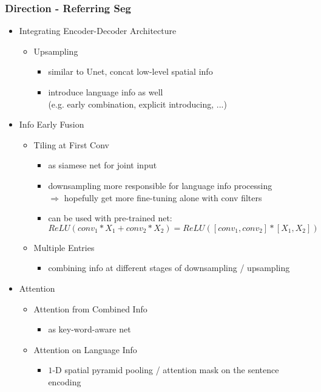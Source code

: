 \subsubsection{Direction - Referring Seg}
\begin{itemize}
\item Integrating Encoder-Decoder Architecture
	\begin{itemize}
	\item Upsampling
		\begin{itemize}
		\item similar to Unet, concat low-level spatial info
		\item introduce language info as well \\
		(e.g. early combination, explicit introducing, ...)
		\end{itemize}
	\end{itemize}
\item Info Early Fusion
	\begin{itemize}
	\item Tiling at First Conv
		\begin{itemize}
		\item as siamese net for joint input
		\item downsampling more responsible for language info processing \\
		$\Rightarrow$ hopefully get more fine-tuning alone with conv filters
		\item can be used with pre-trained net: \\ 
		$ReLU(conv_1*X_1 + conv_2*X_2) = ReLU( [conv_1,conv_2]*[X_1,X_2] )$
		\end{itemize}
	\item Multiple Entries
		\begin{itemize}
		\item combining info at different stages of downsampling / upsampling
		\end{itemize}
	\end{itemize}
\item Attention
	\begin{itemize}
	\item Attention from Combined Info
		\begin{itemize}
		\item as key-word-aware net
		\end{itemize}
	\item Attention on Language Info
		\begin{itemize}
		\item $1$-D spatial pyramid pooling / attention mask on the sentence encoding

\end{itemize}
\end{itemize}
\end{itemize}
